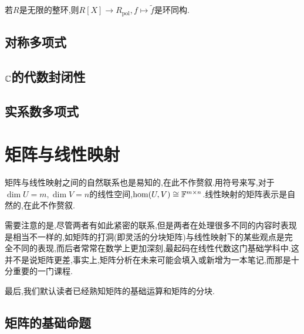 \documentclass[openany]{book}
\begin{document}
\begin{theorem}
    若$R$是无限的整环,则$R[X]\to R_{\mathrm{pol}}, f\mapsto \tilde{f}$是环同构.
\end{theorem}

\section{对称多项式}

\section{$\mathbb{C}$的代数封闭性}

\section{实系数多项式}


\chapter{矩阵与线性映射}
矩阵与线性映射之间的自然联系也是易知的,在此不作赘叙.用符号来写,对于$\dim U=m,\dim V=n$的线性空间,$\hom(U,V)\cong \mathbb{F}^{m\times n}$.线性映射的矩阵表示是自然的,在此不作赘叙.

需要注意的是,尽管两者有如此紧密的联系,但是两者在处理很多不同的内容时表现是相当不一样的,如矩阵的打洞(即灵活的分块矩阵)与线性映射下的某些观点是完全不同的表现,而后者常常在数学上更加深刻,最起码在线性代数这门基础学科中.这并不是说矩阵更差,事实上,矩阵分析在未来可能会填入或新增为一本笔记,而那是十分重要的一门课程.

最后,我们默认读者已经熟知矩阵的基础运算和矩阵的分块.

\section{矩阵的基础命题}
\end{document}
